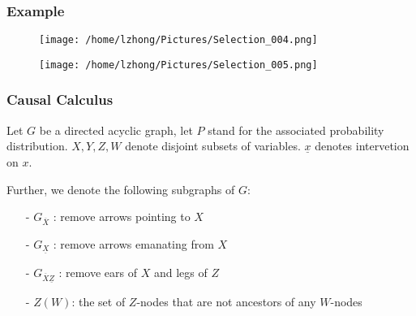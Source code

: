 \documentclass{beamer}
\begin{document}
\begin{frame}
\frametitle{Example}

\begin{figure}
\texttt{[image: /home/lzhong/Pictures/Selection\_004.png]}
\end{figure}


\begin{figure}
\texttt{[image: /home/lzhong/Pictures/Selection\_005.png]}
\end{figure}

\end{frame}

\begin{frame}
\frametitle{Causal Calculus}
Let $G$ be a directed acyclic graph, let $P$ stand for the associated probability distribution. $X,Y,Z,W$ denote disjoint subsets of variables. $\underline{x}$ denotes intervetion on $x$. 

Further, we denote the following subgraphs of $G$:
\begin{itemize}
\item [-] $G_{\overline{X}}$ : remove arrows pointing to $X$
\item [-] $G_{\underline{X}}$ : remove arrows emanating from $X$
\item [-] $G_{\overline{X}\underline{Z}}$ : remove ears of $X$ and legs of $Z$
\item [-] $Z(W)$: the set of $Z$-nodes that are not ancestors of any $W$-nodes
\end{itemize}

\end{frame}
\end{document}
